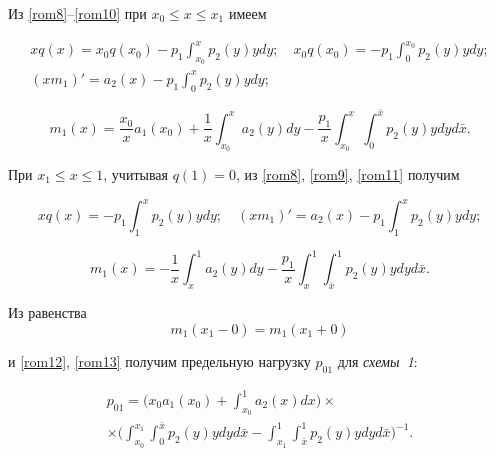 Из \eqref{rom8}--\eqref{rom10} при $x_0\le x\le x_1$ имеем

\begin{gather*}

xq(x)=x_0q(x_0)-p_1\int_{x_0}^x{p_2(y)y}dy;\quad

x_0q(x_0)=-p_1\int_0^{x_0}{p_2(y)y}dy;

\\

(xm_1)'=a_2(x)-p_1\int_0^x{p_2(y)y}dy;

\end{gather*}

\begin{equation}

\label{rom12}

m_1(x)=\frac{x_0}{x}a_1(x_0)+\frac{1}{x}\int_{x_0}^x{a_2(y)}dy-\frac{p_1}{x}\int_{x_0}^x

\int_0^{\bar{x}}{p_2(y)y}dy d \bar{x}.

\end{equation}



При $x_1\le x\le1$, учитывая $q(1)=0$, из \eqref{rom8}, \eqref{rom9}, \eqref{rom11} получим

$$

xq(x)=-p_1\int_1^x{p_2(y)y}dy;\quad (xm_1)'=a_2(x)-p_1\int_1^x{p_2(y)y}dy;

$$

\begin{equation}

\label{rom13}

m_1(x)=-\frac{1}{x}\int_x^1{a_2(y)dy}-\frac{p_1}{x}\int_x^1

 \int_{\bar{x}}^1{p_2(y)y}dy  d\bar{x}.

\end{equation}



Из равенства $$m_1(x_1-0)=m_1(x_1+0)$$

и \eqref{rom12}, \eqref{rom13} получим предельную нагрузку $p_{01}$ для {\sl схемы~1}\/:

\begin{multline}

\label{rom14}

p_{01}=\biggl(x_0a_1(x_0)+\int_{x_0}^1{a_2(x)}dx\biggr)

\times

\\

\times

\biggl(

\int_{x_0}^{x_1}

\int_0^{\bar{x}}{p_2(y)y}dyd\bar{x}-

\int_{x_1}^1 \int_{\bar{x}}^1{p_2(y)y}dy d\bar{x}

\biggr)^{-1}.

\end{multline}



